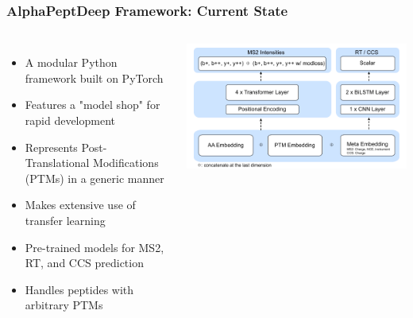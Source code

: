 \documentclass{beamer}
\begin{document}
\begin{frame}
  \frametitle{AlphaPeptDeep Framework: Current State}
  \begin{columns}
      \begin{itemize}
        \item A modular Python framework built on PyTorch
        \item Features a "model shop" for rapid development
        \item Represents Post-Translational Modifications (PTMs) in a generic manner
        \item Makes extensive use of transfer learning
        \item Pre-trained models for MS2, RT, and CCS prediction
        \item Handles peptides with arbitrary PTMs
      \end{itemize}
      \includegraphics[width=\linewidth]{reports/Screenshot from 2025-03-12 20-33-16.png}
  \end{columns}
\end{frame}
\end{document}
